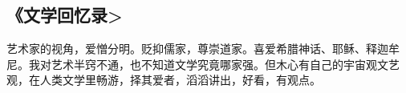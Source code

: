 \subsection{《文学回忆录>}
艺术家的视角，爱憎分明。贬抑儒家，尊崇道家。喜爱希腊神话、耶稣、释迦牟尼。我对艺术半窍不通，也不知道文学究竟哪家强。但木心有自己的宇宙观文艺观，在人类文学里畅游，择其爱者，滔滔讲出，好看，有观点。